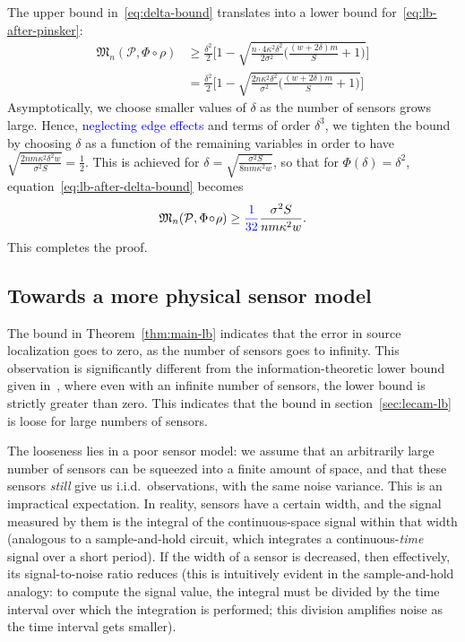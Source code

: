 \documentclass[conference]{IEEEtran}
\newcommand{\Phiorho}{\Phi\!\circ\!\rho}
\begin{document}
\begin{IEEEproof}
The upper bound in~\eqref{eq:delta-bound} translates into a lower
bound for~\eqref{eq:lb-after-pinsker}:
\begin{align}
	\mathfrak{M}_n(\mathcal{P}, \Phiorho) &\geq \frac{\delta^2}{2} \Bigg[ 1 - \sqrt{\frac{n \cdot 4 \kappa^2 \delta^2}{2\sigma^2} \bigg( \frac{(w + 2\delta) m}{S} + 1\bigg)} \Bigg] \\
	&= \frac{\delta^2}{2} \Bigg[ 1 - \sqrt{\frac{2n \kappa^2 \delta^2}{\sigma^2} \bigg( \frac{(w + 2\delta) m}{S} + 1\bigg)} \Bigg] \label{eq:lb-after-delta-bound}
\end{align}
Asymptotically, we choose smaller values of $\delta$ as the number of sensors
grows large. Hence, \textcolor{blue}{neglecting edge effects} and terms of order $\delta^3$, we
tighten the bound by choosing $\delta$ as a function of the remaining variables
in order to have $\sqrt{\frac{2nm\kappa^2\delta^2 w}{\sigma^2 S}} =
\frac{1}{2}$. This is achieved for $\delta = \sqrt{\frac{\sigma^2
S}{8nm\kappa^2 w}}$, so that for $\Phi(\delta) = \delta^2$,
equation~\eqref{eq:lb-after-delta-bound} becomes
\begin{equation}
	\mathfrak{M}_n(\mathcal{P}, \Phiorho) \geq \textcolor{blue}{\frac{1}{32}} \frac{\sigma^2 S}{nm\kappa^2 w}.
\end{equation}
This completes the proof.
\end{IEEEproof}

\subsection{Towards a more physical sensor model}

The bound in Theorem~\ref{thm:main-lb} indicates that the error in source
localization goes to zero, as the number of sensors goes to infinity. This
observation is significantly different from the information-theoretic lower
bound given in~\cite{Grover2016Fundamental}, where even with an infinite number
of sensors, the lower bound is strictly greater than zero. This indicates that
the bound in section~\ref{sec:lecam-lb} is loose for large numbers of sensors.

The looseness lies in a poor sensor model: we assume that an arbitrarily large
number of sensors can be squeezed into a finite amount of space, and that these
sensors \emph{still} give us i.i.d.\ observations, with the same noise
variance. This is an impractical expectation. In reality, sensors have a
certain width, and the signal measured by them is the integral of the
continuous-space signal within that width (analogous to a sample-and-hold
circuit, which integrates a continuous-\emph{time} signal over a short period).
If the width of a sensor is decreased, then effectively, its signal-to-noise
ratio reduces (this is intuitively evident in the sample-and-hold analogy: to
compute the signal value, the integral must be divided by the time interval
over which the integration is performed; this division amplifies noise as the
time interval gets smaller).
\end{document}
